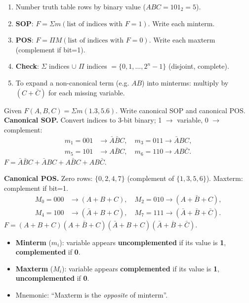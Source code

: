\documentclass[11pt]{article}
\begin{document}
\begin{methode}
\begin{enumerate}
\item Number truth table rows by binary value ($ABC=101_2=5$).
\item \textbf{SOP}: $F=\Sigma m(\text{list of indices with }F=1)$. Write each minterm.
\item \textbf{POS}: $F=\Pi M(\text{list of indices with }F=0)$. Write each maxterm (complement if bit=1).
\item \textbf{Check}: $\Sigma$ indices $\cup$ $\Pi$ indices $= \{0,1,\dots,2^n-1\}$ (disjoint, complete).
\item To expand a non-canonical term (e.g. $AB$) into minterms: multiply by $(C+\bar{C})$ for each missing variable.
\end{enumerate}
\end{methode}

\begin{exoresolu}
Given $F(A,B,C)=\Sigma m(1.3,5.6)$. Write canonical SOP and canonical POS.
\tcblower
\textbf{Canonical SOP.} Convert indices to 3-bit binary; 1 $\to$ variable, 0 $\to$ complement:
\begin{align*}
m_1=001 &\to \bar{A}\bar{B}C, \quad m_3=011 \to \bar{A}BC,\\
m_5=101 &\to A\bar{B}C, \quad m_6=110 \to AB\bar{C}.
\end{align*}
$F=\bar{A}\bar{B}C+\bar{A}BC+A\bar{B}C+AB\bar{C}$.

\textbf{Canonical POS.} Zero rows: $\{0,2,4,7\}$ (complement of $\{1,3,5,6\}$). Maxterm: complement if bit=1.
\begin{align*}
M_0=000 &\to (A+B+C), \quad M_2=010 \to (A+\bar{B}+C),\\
M_4=100 &\to (\bar{A}+B+C), \quad M_7=111 \to (\bar{A}+\bar{B}+\bar{C}).
\end{align*}
$F=(A+B+C)(A+\bar{B}+C)(\bar{A}+B+C)(\bar{A}+\bar{B}+\bar{C})$.
\end{exoresolu}

\begin{attention}
\begin{itemize}
\item \textbf{Minterm} ($m_i$): variable appears \textbf{uncomplemented} if its value is \textbf{1}, \textbf{complemented} if \textbf{0}.
\item \textbf{Maxterm} ($M_i$): variable appears \textbf{complemented} if its value is \textbf{1}, \textbf{uncomplemented} if \textbf{0}.
\item Mnemonic: ``Maxterm is the \emph{opposite} of minterm''.
\end{itemize}
\end{attention}
\end{document}

